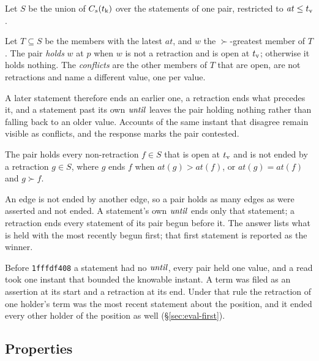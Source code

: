 Let $S$ be the union of $C_s(t_{\mathrm{k}})$ over the statements of one pair, restricted
to $\mathit{at} \le t_{\mathrm{v}}$.

\begin{definition}
Let $T \subseteq S$ be the members with the latest $\mathit{at}$, and $w$ the
$\succ$-greatest member of $T$. The pair \emph{holds} $w$ at $p$ when $w$ is not
a retraction and is open at $t_{\mathrm{v}}$; otherwise it holds nothing. The
\emph{conflicts} are the other members of $T$ that are open, are not
retractions and name a different value, one per value.
\end{definition}

A later statement therefore ends an earlier one, a retraction ends what precedes
it, and a statement past its own $\mathit{until}$ leaves the pair holding nothing rather
than falling back to an older value. Accounts of the same instant that disagree
remain visible as conflicts, and the response marks the pair contested.

\begin{definition}
The pair holds every non-retraction $f \in S$ that is open at $t_{\mathrm{v}}$ and is not
ended by a retraction $g \in S$, where $g$ ends $f$ when
$\mathit{at}(g) > \mathit{at}(f)$, or $\mathit{at}(g) = \mathit{at}(f)$ and
$g \succ f$.
\end{definition}

An edge is not ended by another edge, so a pair holds as many edges as were
asserted and not ended. A statement's own $\mathit{until}$ ends only that statement; a
retraction ends every statement of its pair begun before it. The answer lists
what is held with the most recently begun first; that first statement is
reported as the winner.

\begin{remark}
Before \texttt{1fffdf408} a statement had no $\mathit{until}$, every pair held one value,
and a read took one instant that bounded the knowable instant. A term was filed
as an assertion at its start and a retraction at its end. Under that rule the
retraction of one holder's term was the most recent statement about the
position, and it ended every other holder of the position as well
(\S\ref{sec:eval-first}).
\end{remark}

\subsection{Properties}


